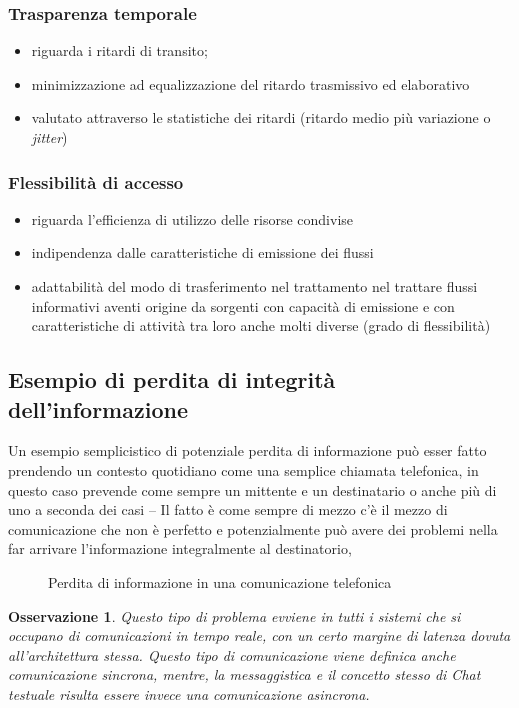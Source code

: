 \documentclass{book}
\newtheorem{oss}{Osservazione}[section]
\begin{document}
\subsubsection{Trasparenza temporale}
\label{sec:trtemp}
\begin{itemize}
\item riguarda i ritardi di transito;
\item minimizzazione ad equalizzazione del ritardo trasmissivo ed elaborativo
\item valutato attraverso le statistiche dei ritardi (ritardo medio più variazione o \textit{jitter})
\end{itemize}

\subsubsection{Flessibilità di accesso}
\label{sec:fldiacc}

\begin{itemize}
\item riguarda l'efficienza di utilizzo delle risorse condivise
\item indipendenza dalle caratteristiche di emissione dei flussi
\item adattabilità del modo di trasferimento nel trattamento nel trattare flussi informativi
  aventi origine da sorgenti con capacità di emissione e con caratteristiche di attività tra loro anche molti
  diverse (grado di flessibilità)
\end{itemize}
\clearpage
\subsection{Esempio di perdita di integrità dell'informazione}
\label{sec:esPerInfo}
Un esempio semplicistico di potenziale perdita di informazione può esser fatto prendendo un contesto quotidiano
come una semplice chiamata telefonica, in questo caso prevende come sempre un mittente e un destinatario o anche
più di uno a seconda dei casi -- Il fatto è come sempre di mezzo c'è il mezzo di comunicazione che non è perfetto
e potenzialmente può avere dei problemi nella far arrivare l'informazione integralmente al destinatorio, 
\begin{figure}[ht!]
  \centering
  
  \caption{Perdita di informazione in una comunicazione telefonica}
  \label{fig:perddiinfoinretetel}
\end{figure}
\begin{oss}
  Questo tipo di problema evviene in tutti i sistemi che si occupano di comunicazioni in tempo reale, con un certo
  margine di latenza dovuta all'architettura stessa. Questo tipo di comunicazione viene definica anche
  comunicazione sincrona, mentre, la messaggistica e il concetto stesso di Chat testuale risulta essere invece
  una comunicazione asincrona.
\end{oss}
\end{document}
